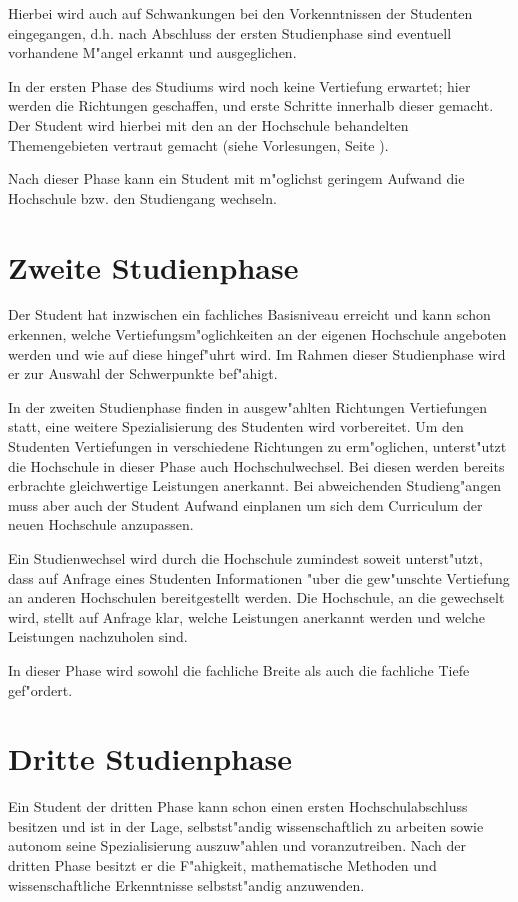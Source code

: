 Hierbei wird auch auf Schwankungen bei den Vorkenntnissen der Studenten
eingegangen, d.h. nach Abschluss der ersten Studienphase sind eventuell 
vorhandene M"angel erkannt und ausgeglichen.

In der ersten Phase des Studiums wird noch keine Vertiefung erwartet; hier werden
die Richtungen geschaffen, und erste Schritte innerhalb dieser gemacht.
Der Student wird hierbei mit den an der Hochschule behandelten Themengebieten
vertraut gemacht (siehe Vorlesungen, Seite \pageref{vorlesung:anforderungen}).

Nach dieser Phase kann ein Student mit m"oglichst geringem Aufwand die Hochschule
bzw. den Studiengang wechseln.


\section{Zweite Studienphase}

Der Student hat inzwischen ein fachliches Basisniveau erreicht und
kann schon erkennen, welche Vertiefungsm"oglichkeiten an der eigenen Hochschule angeboten
werden und wie auf diese hingef"uhrt wird.
Im Rahmen dieser Studienphase wird er zur Auswahl der Schwerpunkte bef"ahigt. 

In der zweiten Studienphase finden in ausgew"ahlten Richtungen Vertiefungen statt,
eine weitere Spezialisierung des Studenten wird vorbereitet. Um den Studenten Vertiefungen in verschiedene Richtungen zu erm"oglichen, unterst"utzt die Hochschule
in dieser Phase auch Hochschulwechsel.
Bei diesen werden bereits erbrachte gleichwertige Leistungen anerkannt.
Bei abweichenden Studieng"angen muss
aber auch der Student Aufwand einplanen um sich dem Curriculum der neuen
Hochschule anzupassen.

Ein Studienwechsel wird durch die Hochschule zumindest soweit unterst"utzt, dass auf Anfrage eines Studenten Informationen "uber die gew"unschte Vertiefung an anderen Hochschulen bereitgestellt werden. Die Hochschule, an die gewechselt wird, stellt auf Anfrage klar, welche Leistungen anerkannt werden und welche Leistungen nachzuholen sind.

In dieser Phase wird sowohl die fachliche Breite als auch die fachliche Tiefe gef"ordert.

\section{Dritte Studienphase}

Ein Student der dritten Phase kann schon einen ersten Hochschulabschluss besitzen
und ist in der Lage, selbstst"andig wissenschaftlich zu arbeiten sowie autonom seine Spezialisierung
auszuw"ahlen und voranzutreiben. Nach der dritten Phase besitzt er die F"ahigkeit,
mathematische Methoden und wissenschaftliche Erkenntnisse selbstst"andig anzuwenden.

